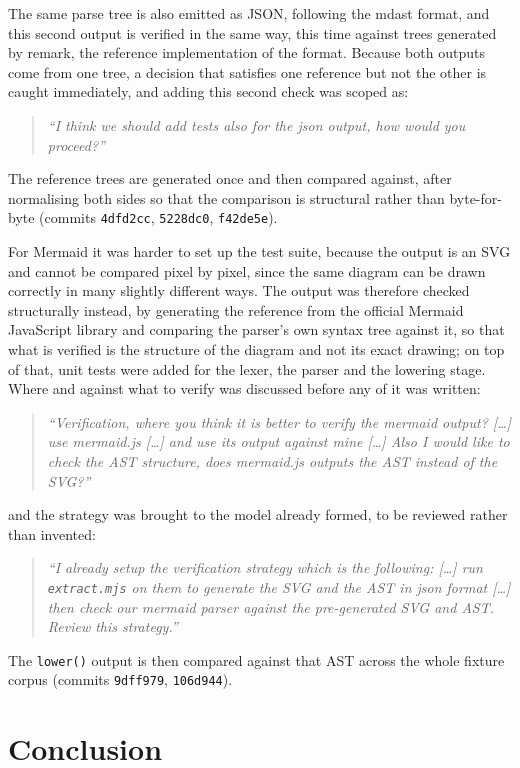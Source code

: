\documentclass[12pt]{report}
\begin{document}
The same parse tree is also emitted as JSON, following the mdast format, and this second output is verified in the same way, this time against trees generated by remark, the reference implementation of the format. Because both outputs come from one tree, a decision that satisfies one reference but not the other is caught immediately, and adding this second check was scoped as:
\begin{quote}\itshape ``I think we should add tests also for the json output, how would you proceed?''\end{quote}
The reference trees are generated once and then compared against, after normalising both sides so that the comparison is structural rather than byte-for-byte (commits \verb|4dfd2cc|, \verb|5228dc0|, \verb|f42de5e|).

For Mermaid it was harder to set up the test suite, because the output is an SVG and cannot be compared pixel by pixel, since the same diagram can be drawn correctly in many slightly different ways. The output was therefore checked structurally instead, by generating the reference from the official Mermaid JavaScript library and comparing the parser's own syntax tree against it, so that what is verified is the structure of the diagram and not its exact drawing; on top of that, unit tests were added for the lexer, the parser and the lowering stage. Where and against what to verify was discussed before any of it was written:
\begin{quote}\itshape ``Verification, where you think it is better to verify the mermaid output? [\ldots] use mermaid.js [\ldots] and use its output against mine [\ldots] Also I would like to check the AST structure, does mermaid.js outputs the AST instead of the SVG?''\end{quote}
and the strategy was brought to the model already formed, to be reviewed rather than invented:
\begin{quote}\itshape ``I already setup the verification strategy which is the following: [\ldots] run \verb|extract.mjs| on them to generate the SVG and the AST in json format [\ldots] then check our mermaid parser against the pre-generated SVG and AST. Review this strategy.''\end{quote}
The \verb|lower()| output is then compared against that AST across the whole fixture corpus (commits \verb|9dff979|, \verb|106d944|).

\section{Conclusion}
\end{document}
